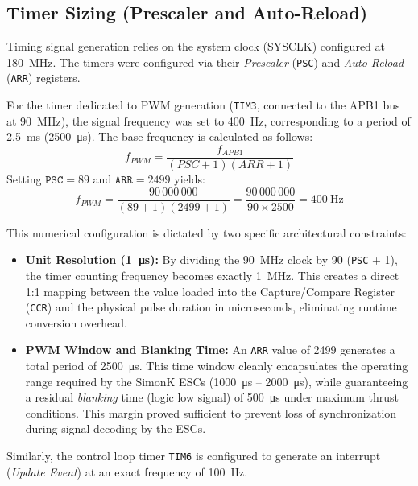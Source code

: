 \documentclass[11pt, a4paper]{article}
\begin{document}
\subsection{Timer Sizing (Prescaler and Auto-Reload)}
Timing signal generation relies on the system clock (SYSCLK) configured at \SI{180}{\mega\hertz}. The timers were configured via their \textit{Prescaler} (\texttt{PSC}) and \textit{Auto-Reload} (\texttt{ARR}) registers.

For the timer dedicated to PWM generation (\texttt{TIM3}, connected to the APB1 bus at \SI{90}{\mega\hertz}), the signal frequency was set to \SI{400}{\hertz}, corresponding to a period of \SI{2.5}{\milli\second} (\SI{2500}{\micro\second}). The base frequency is calculated as follows:
\begin{equation}
    f_{PWM} = \frac{f_{APB1}}{(PSC + 1)(ARR + 1)}
\end{equation}
Setting $\texttt{PSC} = 89$ and $\texttt{ARR} = 2499$ yields:
\begin{equation*}
    f_{PWM} = \frac{90\,000\,000}{(89 + 1)(2499 + 1)} = \frac{90\,000\,000}{90 \times 2500} = \SI{400}{\hertz}
\end{equation*}

This numerical configuration is dictated by two specific architectural constraints:
\begin{itemize}
    \item \textbf{Unit Resolution (\SI{1}{\micro\second}):} By dividing the \SI{90}{\mega\hertz} clock by 90 (\texttt{PSC} + 1), the timer counting frequency becomes exactly \SI{1}{\mega\hertz}. This creates a direct 1:1 mapping between the value loaded into the Capture/Compare Register (\texttt{CCR}) and the physical pulse duration in microseconds, eliminating runtime conversion overhead.
    \item \textbf{PWM Window and Blanking Time:} An \texttt{ARR} value of 2499 generates a total period of \SI{2500}{\micro\second}. This time window cleanly encapsulates the operating range required by the SimonK ESCs (\SI{1000}{\micro\second} -- \SI{2000}{\micro\second}), while guaranteeing a residual \textit{blanking} time (logic low signal) of \SI{500}{\micro\second} under maximum thrust conditions. This margin proved sufficient to prevent loss of synchronization during signal decoding by the ESCs.
\end{itemize}

Similarly, the control loop timer \texttt{TIM6} is configured to generate an interrupt (\textit{Update Event}) at an exact frequency of \SI{100}{\hertz}.
\end{document}

